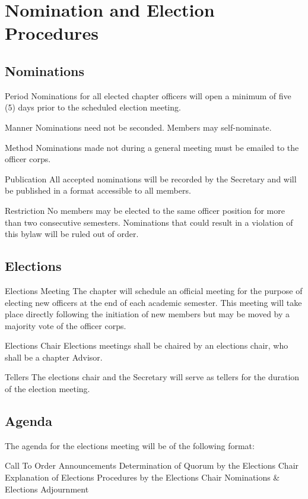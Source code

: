 \chapter{Nomination and Election Procedures}\label{app:elections}

\section{Nominations}
\begin{enumsubsection}
\item{Period} Nominations for all elected chapter officers will open a minimum of five (5) days prior to the scheduled election meeting.
\item{Manner} Nominations need not be seconded. Members may self-nominate. 
\item{Method} Nominations made not during a general meeting must be emailed to the officer corps. 
\item{Publication} All accepted nominations will be recorded by the Secretary and will be published in a format accessible to all members.
\item{Restriction} No members may be elected to the same officer position for more than two consecutive semesters. Nominations that could result in a violation of this bylaw will be ruled out of order.
\end{enumsubsection}

\section{Elections}
\begin{enumsubsection}
\item{Elections Meeting} The chapter will schedule an official meeting for the purpose of electing new officers at the end of each academic semester. This meeting will take place directly following the initiation of new members but may be moved by a majority vote of the officer corps.
\item{Elections Chair} Elections meetings shall be chaired by an elections chair, who shall be a chapter Advisor.
\item{Tellers} The elections chair and the Secretary will serve as tellers for the duration of the election meeting.
\end{enumsubsection}

\section{Agenda}
The agenda for the elections meeting will be of the following format:
\begin{enumsubsection}
\itemnotoc Call To Order
\itemnotoc Announcements
\itemnotoc Determination of Quorum by the Elections Chair
\itemnotoc Explanation of Elections Procedures by the Elections Chair
\itemnotoc Nominations \& Elections
\itemnotoc  Adjournment
\end{enumsubsection}

